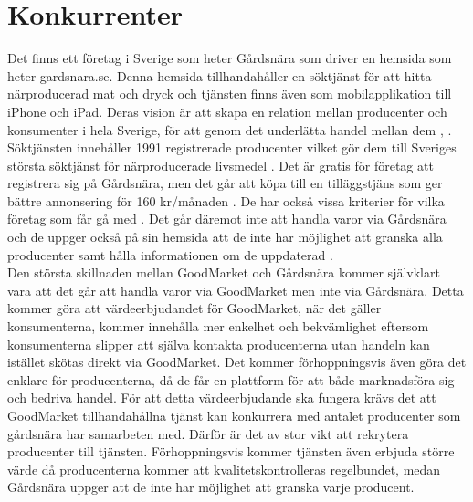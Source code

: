 \documentclass[10pt,a4paper,oneside]{article}
\begin{document}
\section{Konkurrenter}
Det finns ett företag i Sverige som heter Gårdsnära som driver en hemsida som heter gardsnara.se. Denna hemsida tillhandahåller en söktjänst för att hitta närproducerad mat och dryck och tjänsten finns även som mobilapplikation till iPhone och iPad. Deras vision är att skapa en relation mellan producenter och konsumenter i hela Sverige, för att genom det underlätta handel mellan dem \cite{G2}, \cite{G3}. Söktjänsten innehåller 1991 registrerade producenter vilket gör dem till Sveriges största söktjänst för närproducerade livsmedel \cite{G4}. Det är gratis för företag att registrera sig på Gårdsnära, men det går att köpa till en tilläggstjäns som ger bättre annonsering för 160 kr/månaden \cite{G5}. De har också vissa kriterier för vilka företag som får gå med \cite{G}. Det går däremot inte att handla varor via Gårdsnära och de uppger också på sin hemsida att de inte har möjlighet att granska alla producenter samt hålla informationen om de uppdaterad \cite{G2}.\\

Den största skillnaden mellan GoodMarket och Gårdsnära kommer självklart vara att det går att handla varor via GoodMarket men inte via Gårdsnära. Detta kommer göra att värdeerbjudandet för GoodMarket, när det gäller konsumenterna, kommer innehålla mer enkelhet och bekvämlighet eftersom konsumenterna slipper att själva kontakta producenterna utan handeln kan istället skötas direkt via GoodMarket. Det kommer förhoppningsvis även göra det enklare för producenterna, då de får en plattform för att både marknadsföra sig och bedriva handel. För att detta värdeerbjudande ska fungera krävs det att GoodMarket tillhandahållna tjänst kan konkurrera med antalet producenter som gårdsnära har samarbeten med. Därför är det av stor vikt att rekrytera producenter till tjänsten. Förhoppningsvis kommer tjänsten även erbjuda större värde då producenterna kommer att kvalitetskontrolleras regelbundet, medan Gårdsnära uppger att de inte har möjlighet att granska varje producent.\\
\end{document}
